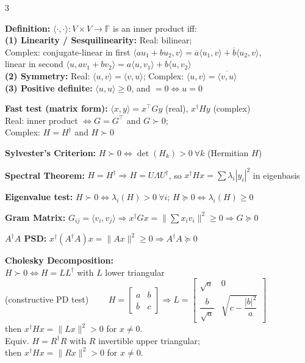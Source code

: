 \documentclass[10pt]{article}
\newenvironment{cheatitems}{\par\vspace{-1pt}}{\par\vspace{-1pt}}
\newcommand{\cheatrow}[2]{%
  \par\noindent\textbf{#1:}\nobreak\enspace #2\par
}
\begin{document}
\begin{multicols}{3}
\begin{cheatitems}
\cheatrow{Definition}{
$\langle\cdot,\cdot\rangle:V\times V\to\mathbb{F}$ is an inner product iff: \\
\textbf{(1) Linearity / Sesquilinearity:}
Real: bilinear; \\
Complex: conjugate-linear in first $\langle au_1+bu_2,v\rangle=\overline{a}\langle u_1,v\rangle+\overline{b}\langle u_2,v\rangle$, \\
linear in second $\langle u,av_1+bv_2\rangle=a\langle u,v_1\rangle+b\langle u,v_2\rangle$ \\
\textbf{(2) Symmetry:}
Real: $\langle u,v\rangle=\langle v,u\rangle$;
Complex: $\langle u,v\rangle=\overline{\langle v,u\rangle}$ \\
\textbf{(3) Positive definite:}
$\langle u,u\rangle\ge0$, and $=0 \iff u=0$
}

\cheatrow{Fast test (matrix form)}{
$\langle x,y\rangle = x^\top G y$ (real), $x^\dagger H y$ (complex) \\
Real: inner product $\iff G=G^\top$ and $G \succ 0$; \\
Complex: $H=H^\dagger$ and $H \succ 0$
}

\cheatrow{Sylvester's Criterion}{
$H\succ0 \iff \det(H_k)>0\ \forall k$ (Hermitian $H$)
}

\cheatrow{Spectral Theorem}{
$H=H^\dagger \Rightarrow H=U\Lambda U^\dagger$, so $x^\dagger H x=\sum \lambda_i |y_i|^2$ in eigenbasis
}

\cheatrow{Eigenvalue test}{
$H \succ 0 \iff \lambda_i(H)>0 \ \forall i$; $H \succeq 0 \iff \lambda_i(H)\ge0$
}

\cheatrow{Gram Matrix}{
$G_{ij}=\langle v_i,v_j\rangle \Rightarrow x^\dagger G x=\|\sum x_i v_i\|^2 \ge 0 \Rightarrow G \succeq 0$
}

\cheatrow{$A^\dagger A$ PSD}{
$x^\dagger (A^\dagger A)x = \|Ax\|^2 \ge 0 \Rightarrow A^\dagger A \succeq 0$
}
\cheatrow{Cholesky Decomposition}{\\
$H \succ 0 \iff H=LL^\dagger$ with $L$ lower triangular 
\vspace{-8pt}
\\
(constructive PD test) 
$\qquad H=\begin{bmatrix}a&b\\ \overline{b}&c\end{bmatrix}
\Rightarrow 
L=\begin{bmatrix}
\sqrt{a} & 0\\[4pt]
\dfrac{b}{\sqrt{a}} & \sqrt{c-\dfrac{|b|^2}{a}}
\end{bmatrix}$ \vspace{-15pt} \\[6pt]
then $x^\dagger Hx=\|Lx\|^2>0$ for $x\ne0$. \\
Equiv. $H=R^\dagger R$ with $R$ invertible upper triangular;\\
then $x^\dagger Hx=\|Rx\|^2>0$ for $x\ne0$.}


\end{cheatitems}
\end{multicols}
\end{document}
